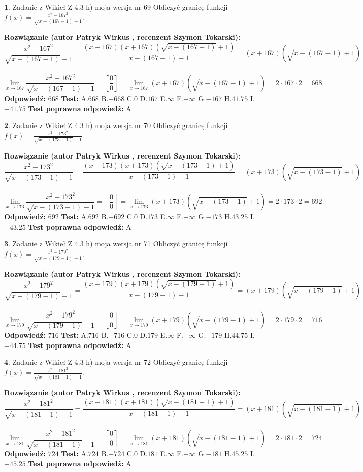\documentclass[12pt, a4paper]{article}
\theoremstyle{definition} %
\newtheorem{zad}{}
\newcommand{\zadStart}[1]{\begin{zad}#1\newline}
\newcommand{\zadStop}{\end{zad}}
\newcommand{\rozwStart}[2]{\noindent \textbf{Rozwiązanie (autor #1 , recenzent #2): }\newline}
\newcommand{\rozwStop}{\newline}
\newcommand{\odpStart}{\noindent \textbf{Odpowiedź:}\newline}
\newcommand{\odpStop}{\newline}
\newcommand{\testStart}{\noindent \textbf{Test:}\newline}
\newcommand{\testStop}{\newline}
\newcommand{\kluczStart}{\noindent \textbf{Test poprawna odpowiedź:}\newline}
\newcommand{\kluczStop}{\newline}
\begin{document}
\zadStart{Zadanie z Wikieł Z 4.3 h) moja wersja nr 69}
Obliczyć granicę funkcji $f(x)=\frac{x^{2} - 167^{2}}{\sqrt{x-(167-1)}-1}$.
\zadStop
\rozwStart{Patryk Wirkus}{Szymon Tokarski}
$$\frac{x^{2} - 167^{2}}{\sqrt{x-(167-1)}-1}=\frac{(x-167)(x+167)(\sqrt{x-(167-1)}+1)}{x-(167-1)-1}=(x+167)(\sqrt{x-(167-1)}+1)$$
\\
$$\lim\limits_{x\to 167}\frac{x^{2} - 167^{2}}{\sqrt{x-(167-1)}-1}=[\frac{0}{0}]=
\lim\limits_{x\to 167}(x+167)(\sqrt{x-(167-1)}+1) = 2\cdot167 \cdot 2 = 668$$
\rozwStop
\odpStart
$668$
\odpStop
\testStart
A.$668$
B.$-668$
C.$0$
D.$167$
E.$\infty$
F.$-\infty$
G.$-167$
H.$41.75$
I.$-41.75$
\testStop
\kluczStart
A
\kluczStop



\zadStart{Zadanie z Wikieł Z 4.3 h) moja wersja nr 70}
Obliczyć granicę funkcji $f(x)=\frac{x^{2} - 173^{2}}{\sqrt{x-(173-1)}-1}$.
\zadStop
\rozwStart{Patryk Wirkus}{Szymon Tokarski}
$$\frac{x^{2} - 173^{2}}{\sqrt{x-(173-1)}-1}=\frac{(x-173)(x+173)(\sqrt{x-(173-1)}+1)}{x-(173-1)-1}=(x+173)(\sqrt{x-(173-1)}+1)$$
\\
$$\lim\limits_{x\to 173}\frac{x^{2} - 173^{2}}{\sqrt{x-(173-1)}-1}=[\frac{0}{0}]=
\lim\limits_{x\to 173}(x+173)(\sqrt{x-(173-1)}+1) = 2\cdot173 \cdot 2 = 692$$
\rozwStop
\odpStart
$692$
\odpStop
\testStart
A.$692$
B.$-692$
C.$0$
D.$173$
E.$\infty$
F.$-\infty$
G.$-173$
H.$43.25$
I.$-43.25$
\testStop
\kluczStart
A
\kluczStop



\zadStart{Zadanie z Wikieł Z 4.3 h) moja wersja nr 71}
Obliczyć granicę funkcji $f(x)=\frac{x^{2} - 179^{2}}{\sqrt{x-(179-1)}-1}$.
\zadStop
\rozwStart{Patryk Wirkus}{Szymon Tokarski}
$$\frac{x^{2} - 179^{2}}{\sqrt{x-(179-1)}-1}=\frac{(x-179)(x+179)(\sqrt{x-(179-1)}+1)}{x-(179-1)-1}=(x+179)(\sqrt{x-(179-1)}+1)$$
\\
$$\lim\limits_{x\to 179}\frac{x^{2} - 179^{2}}{\sqrt{x-(179-1)}-1}=[\frac{0}{0}]=
\lim\limits_{x\to 179}(x+179)(\sqrt{x-(179-1)}+1) = 2\cdot179 \cdot 2 = 716$$
\rozwStop
\odpStart
$716$
\odpStop
\testStart
A.$716$
B.$-716$
C.$0$
D.$179$
E.$\infty$
F.$-\infty$
G.$-179$
H.$44.75$
I.$-44.75$
\testStop
\kluczStart
A
\kluczStop



\zadStart{Zadanie z Wikieł Z 4.3 h) moja wersja nr 72}
Obliczyć granicę funkcji $f(x)=\frac{x^{2} - 181^{2}}{\sqrt{x-(181-1)}-1}$.
\zadStop
\rozwStart{Patryk Wirkus}{Szymon Tokarski}
$$\frac{x^{2} - 181^{2}}{\sqrt{x-(181-1)}-1}=\frac{(x-181)(x+181)(\sqrt{x-(181-1)}+1)}{x-(181-1)-1}=(x+181)(\sqrt{x-(181-1)}+1)$$
\\
$$\lim\limits_{x\to 181}\frac{x^{2} - 181^{2}}{\sqrt{x-(181-1)}-1}=[\frac{0}{0}]=
\lim\limits_{x\to 181}(x+181)(\sqrt{x-(181-1)}+1) = 2\cdot181 \cdot 2 = 724$$
\rozwStop
\odpStart
$724$
\odpStop
\testStart
A.$724$
B.$-724$
C.$0$
D.$181$
E.$\infty$
F.$-\infty$
G.$-181$
H.$45.25$
I.$-45.25$
\testStop
\kluczStart
A
\kluczStop
\end{document}
